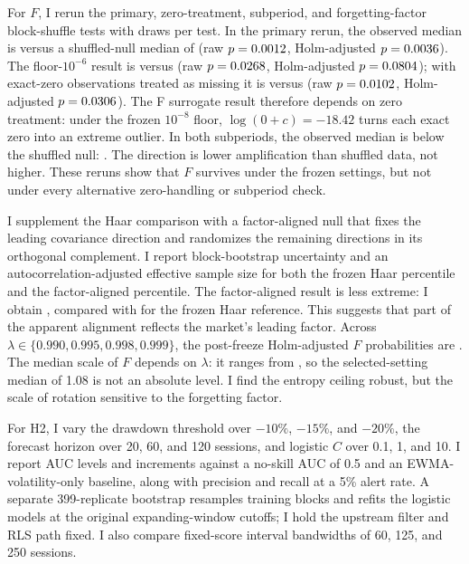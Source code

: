 \documentclass[11pt]{article}
\begin{document}
For $F$, I rerun the primary, zero-treatment, subperiod, and forgetting-factor block-shuffle tests with \FPrecisionDraws{} draws per test. In the primary rerun, the observed median is \FPrimaryObserved{} versus a shuffled-null median of \FPrimaryNull{} (raw $p=0.0012$, Holm-adjusted $p=0.0036$). The floor-$10^{-6}$ result is \FFloorObserved{} versus \FFloorNull{} (raw $p=0.0268$, Holm-adjusted $p=0.0804$); with exact-zero observations treated as missing it is \FMissingObserved{} versus \FMissingNull{} (raw $p=0.0102$, Holm-adjusted $p=0.0306$). The F surrogate result therefore depends on zero treatment: under the frozen $10^{-8}$ floor, $\log(0+c)=-18.42$ turns each exact zero into an extreme outlier. In both subperiods, the observed median is below the shuffled null: \FSubperiodSummary. The direction is lower amplification than shuffled data, not higher. These reruns show that $F$ survives under the frozen settings, but not under every alternative zero-handling or subperiod check.

I supplement the Haar comparison with a factor-aligned null that fixes the leading covariance direction and randomizes the remaining directions in its orthogonal complement. I report block-bootstrap uncertainty and an autocorrelation-adjusted effective sample size for both the frozen Haar percentile and the factor-aligned percentile. The factor-aligned result is less extreme: I obtain \FactorAlignedMedianPercentile, compared with \HaarMedianPercentile{} for the frozen Haar reference. This suggests that part of the apparent alignment reflects the market's leading factor. Across $\lambda\in\{0.990,0.995,0.998,0.999\}$, the post-freeze Holm-adjusted $F$ probabilities are \FLambdaHolmSummary. The median scale of $F$ depends on $\lambda$: it ranges from \FScaleLambdaRange, so the selected-setting median of 1.08 is not an absolute level. I find the entropy ceiling robust, but the scale of rotation sensitive to the forgetting factor.

For H2, I vary the drawdown threshold over $-10\%$, $-15\%$, and $-20\%$, the forecast horizon over 20, 60, and 120 sessions, and logistic $C$ over 0.1, 1, and 10. I report AUC levels and increments against a no-skill AUC of 0.5 and an EWMA-volatility-only baseline, along with precision and recall at a 5\% alert rate. A separate 399-replicate bootstrap resamples training blocks and refits the logistic models at the original expanding-window cutoffs; I hold the upstream filter and RLS path fixed. I also compare fixed-score interval bandwidths of 60, 125, and 250 sessions.
\end{document}
